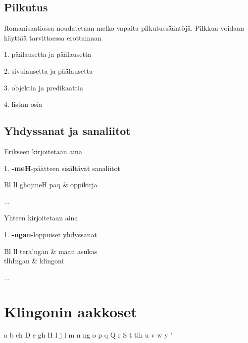 \documentclass{book}
\begin{document}
\section{Pilkutus}

Romanisaatiossa noudatetaan melko vapaita pilkutussääntöjä.
Pilkkua voidaan käyttää tarvittaessa erottamaan

1. päälausetta ja päälausetta

2. sivulausetta ja päälausetta

3. objektia ja predikaattia

4. listan osia

\section{Yhdyssanat ja sanaliitot}

Erikseen kirjoitetaan aina

1. \textbf{-meH}-päätteen sisältävät sanaliitot

\begin{tabular}{Bl Il}
    ghojmeH paq & oppikirja \\
\end{tabular}

...

Yhteen kirjoitetaan aina

1. \textbf{-ngan}-loppuiset yhdyssanat

\begin{tabular}{Bl Il}
    tera'ngan & maan asukas \\
    tlhIngan & klingoni \\
\end{tabular}

...

\appendix
\chapter{Klingonin aakkoset}

a b ch D e gh H I j l m n ng o p q Q r S t tlh u v w y ' 
\end{document}

